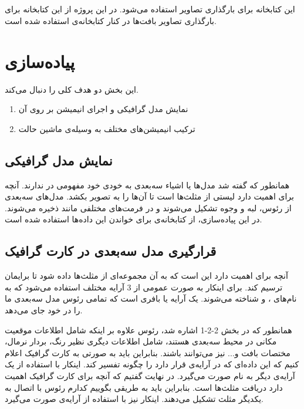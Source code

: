   
\subsection{}

این کتابخانه برای بارگذاری تصاویر استفاده می‌شود. در این پروژه از این کتابخانه برای بارگذاری
تصاویر بافت‌ها در کنار کتابخانه‌ی 
استفاده شده است.
\cite{stb}


\section{پیاده‌سازی}

این بخش دو هدف کلی را دنبال می‌کند.

\begin{enumerate}
	\item نمایش مدل گرافیکی و اجرای انیمیشن بر روی ‌آن
	\item ترکیب انیمیشن‌های مختلف به وسیله‌ی ماشین حالت

\end{enumerate}

\subsection{نمایش مدل گرافیکی}

همانطور که گفته شد مدل‌ها یا اشیاء سه‌بعدی به خودی خود مفهومی در 
ندارند. آنچه برای 
اهمیت دارد لیستی از مثلث‌ها است تا آن‌ها را به تصویر بکشد.
مدل‌های سه‌بعدی از رئوس، لبه و وجوه تشکیل می‌شوند و در فرمت‌های مختلفی مانند
ذخیره می‌شوند. در این پیا‌ده‌سازی، از کتابخانه‌ی 
برای خواندن این داده‌ها استفاده شده است.

\subsection{قرارگیری مدل سه‌بعدی در کارت گرافیک}

آنچه برای 
 اهمیت دارد این است که به آن مجموعه‌ای از مثلث‌ها داده شود تا برایمان ترسیم کند.
برای اینکار به صورت عمومی از 3 آرایه مختلف استفاده می‌شود که به نام‌های 
،
و 
شناخته می‌شوند.
یک آرایه یا بافری است که تمامی رئوس مدل سه‌بعدی ما را در خود جای می‌دهد.

همانطور که در بخش  2-2-1
اشاره شد، رئوس علاوه بر اینکه شامل اطلاعات موقعیت مکانی در محیط سه‌بعدی هستند، شامل اطلاعات دیگری 
نظیر رنگ، بردار نرمال، مختصات بافت  و... نیز می‌توانند باشند. بنابراین باید به صورتی به کارت گرافیک 
اعلام کنیم که این داده‌ای که در آرایه‌ی 
قرار دارد را چگونه تفسیر کند.
اینکار با استفاده از یک آرایه‌ی دیگر به نام 
صورت می‌گیرد.
در نهایت گفتیم که آنچه برای کارت گرافیک اهمیت دارد دریافت مثلث‌ها است. بنابراین باید به طریقی بگوییم کدارم رئوس با 
اتصال به یکدیگر مثلث تشکیل می‌دهند. اینکار نیز با استفاده از آرایه‌ی 
صورت می‌گیرد.


